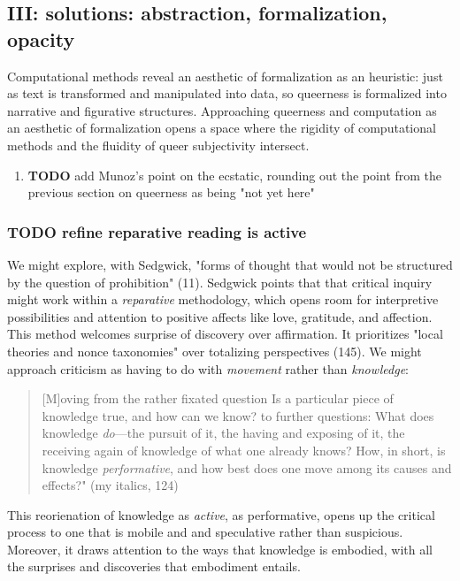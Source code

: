 \documentclass[11pt]{article}
\begin{document}
\subsection{III: solutions: abstraction, formalization, opacity}
\label{sec:org3e9192a}
Computational methods reveal an aesthetic of formalization as an
heuristic: just as text is transformed and manipulated into data, so
queerness is formalized into narrative and figurative
structures. Approaching queerness and computation as an aesthetic of
formalization opens a space where the rigidity of computational
methods and the fluidity of queer subjectivity intersect.

\begin{enumerate}
\item {\bfseries\sffamily TODO} add Munoz's point on the ecstatic, rounding out the point
\label{sec:orga26b924}
from the previous section on queerness as being "not yet here"
\end{enumerate}
\subsubsection{{\bfseries\sffamily TODO} refine reparative reading is active}
\label{sec:orgbbd4f73}

We might explore, with Sedgwick, "forms of thought that would not be
structured by the question of prohibition" (11). Sedgwick points that
that critical inquiry might work within a \emph{reparative} methodology,
which opens room for interpretive possibilities and attention to
positive affects like love, gratitude, and affection. This method
welcomes surprise of discovery over affirmation. It prioritizes "local
theories and nonce taxonomies" over totalizing perspectives (145). We
might approach criticism as having to do with \emph{movement} rather than
\emph{knowledge}:

\begin{quote}
[M]oving from the rather fixated question Is a particular piece of
knowledge true, and how can we know? to further questions: What does
knowledge \emph{do}---the pursuit of it, the having and exposing of it, the
receiving again of knowledge of what one already knows? How, in short,
is knowledge \emph{performative}, and how best does one move among its
causes and effects?" (my italics, 124)
\end{quote}

This reorienation of knowledge as \emph{active}, as performative, opens up
the critical process to one that is mobile and and speculative rather
than suspicious. Moreover, it draws attention to the ways that
knowledge is embodied, with all the surprises and discoveries that
embodiment entails. 
\end{document}
